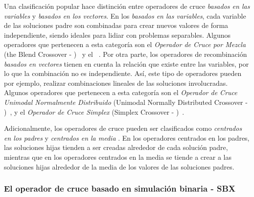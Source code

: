Una clasificación popular hace distinción entre operadores de cruce \textit{basados en las variables} y \textit{basados en los vectores}.
%
En los \textit{basados en las variables}, cada variable de las soluciones padre son combinadas para crear nuevos valores de 
forma independiente, siendo ideales para
lidiar con problemas separables.
%
Algunos operadores que pertenecen a esta categoría son el \textit{Operador de Cruce por Mezcla} (the Blend Crossover - \BLX{})~\cite{eshelman1993real} 
y el \SBX~\cite{Joel:SBX1994}.
%
Por otra parte, los operadores de recombinación \textit{basados en vectores} tienen en cuenta la relación que existe entre las variables, por lo que
la combinación no es independiente.
%
Así, este tipo de operadores pueden por ejemplo, realizar combinaciones lineales de las soluciones involucradas.
%
Algunos operadores que pertenecen a esta categoría son el \textit{Operador de Cruce Unimodal Normalmente Distribuido} (Unimodal Normally Distributed Crossover - \UNDX{})~\cite{Joel:UNDX}, 
y el \textit{Operador de Cruce Simplex} (Simplex Crossover - \SPX{})~\cite{Joel:DE_Storn_SPX}.

Adicionalmente, los operadores de cruce pueden ser clasificados como \textit{centrados en los padres} y \textit{centrados en la media} \cite{jain2011parent}.
%
En los operadores centrados en los padres, las soluciones hijas tienden a ser creadas alrededor 
de cada solución padre, mientras que en los operadores centrados 
en la media se tiende a crear a las soluciones hijas alrededor de la media de los valores de las soluciones padres.

\subsubsection{El operador de cruce basado en simulación binaria - SBX}

